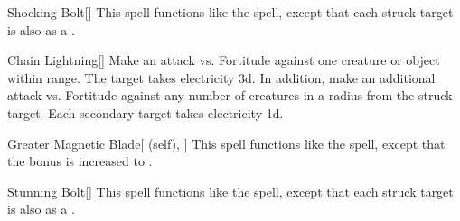 \lowercase{\hypertarget{spell:Shocking Bolt}{}}\label{spell:Shocking Bolt}
\begin{apability}[\nth{3}]{\hypertarget{spell:Shocking Bolt}{Shocking Bolt}}[]
This spell functions like the  spell, except that each struck target is also  as a .
\end{apability}
\vspace{0.25em}



\lowercase{\hypertarget{spell:Chain Lightning}{}}\label{spell:Chain Lightning}
\begin{apability}[\nth{4}]{\hypertarget{spell:Chain Lightning}{Chain Lightning}}[]
Make an attack vs. Fortitude against one creature or object within \rngmed range.
\hit The target takes electricity  \plus3d.
In addition, make an additional attack vs. Fortitude against any number of creatures in a \areamed radius from the struck target.
\hit Each secondary target takes electricity  \plus1d.
\end{apability}
\vspace{0.25em}



\lowercase{\hypertarget{spell:Greater Magnetic Blade}{}}\label{spell:Greater Magnetic Blade}
\begin{attuneability}[\nth{6}]{\hypertarget{spell:Greater Magnetic Blade}{Greater Magnetic Blade}}[ (self), ]
This spell functions like the  spell, except that the bonus is increased to .
\end{attuneability}
\vspace{0.25em}



\lowercase{\hypertarget{spell:Stunning Bolt}{}}\label{spell:Stunning Bolt}
\begin{apability}[\nth{6}]{\hypertarget{spell:Stunning Bolt}{Stunning Bolt}}[]
This spell functions like the  spell, except that each struck target is also  as a .
\end{apability}
\vspace{0.25em}


